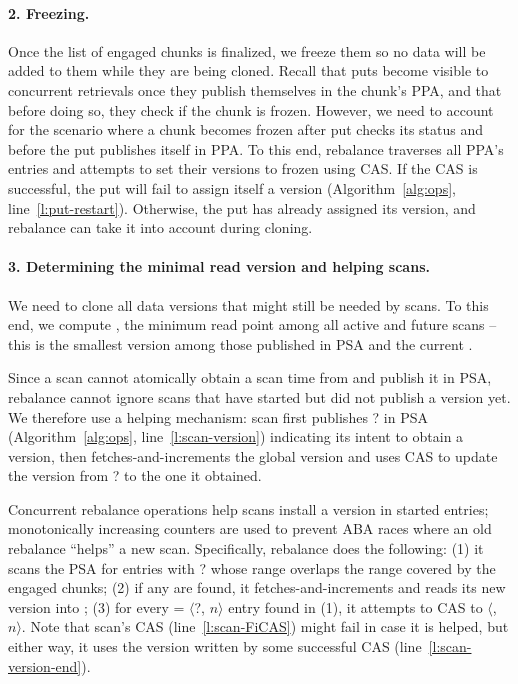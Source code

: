 \paragraph{2. Freezing.}

Once the list of engaged chunks is finalized, we freeze them so no data will be added to them
while they are being cloned. Recall that puts become visible to concurrent retrievals once they
publish themselves in the chunk's PPA, and that before doing so, they check if the chunk
is frozen. However, we need to account for the scenario where a chunk becomes frozen after
put checks its status and before the put publishes itself in PPA.
To this end,
rebalance traverses all PPA's entries and attempts to set their versions to frozen using CAS.
If the CAS is successful, the put will fail to assign itself a version
(Algorithm~\ref{alg:ops}, line~\ref{l:put-restart}). Otherwise, the put has already assigned its version, and
rebalance can take it into account during cloning.

\paragraph{3. Determining the minimal read version and helping scans.}

We need to clone all data versions that might still be needed by scans.
To this end, we compute , the minimum read point among all active  and future scans --
this is the smallest version among those published in PSA and the current .

Since a scan cannot atomically obtain a scan time from  and publish it in PSA,
rebalance cannot ignore scans that have started but did not publish a version yet.
We therefore use a helping mechanism: scan first publishes ? in PSA (Algorithm~\ref{alg:ops}, line~\ref{l:scan-version})
indicating its intent to obtain a version, then fetches-and-increments the global version
and uses CAS to update the version from ? to the one it obtained.

Concurrent rebalance operations help scans install a version in started entries;
monotonically increasing counters are used to prevent ABA races where an old rebalance ``helps'' a new scan.
Specifically, rebalance does the following: (1) it scans the  PSA for entries with ? whose range overlaps the
range covered by the engaged chunks; (2) if any are found, it fetches-and-increments  and
reads its new version into ; (3) for every =  $\langle$?, $n \rangle$ entry found in (1),
it attempts to CAS  to  $\langle$, $n \rangle$.
Note that scan's CAS (line~\ref{l:scan-FiCAS})  might fail  in case it is helped, but
either way, it uses the version written by some successful CAS (line~\ref{l:scan-version-end}).


